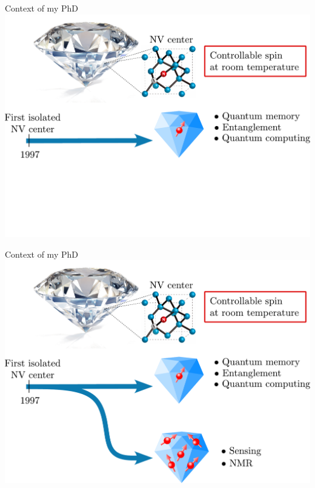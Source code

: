 \documentclass{beamer}
\begin{document}
\begin{frame}{Context of my PhD}
\centering
\includegraphics[width=\textwidth,height=0.85\textheight,keepaspectratio]{Slide_contexte_f-3}
\end{frame}

\begin{frame}{Context of my PhD}
\centering
\includegraphics[width=\textwidth,height=0.85\textheight,keepaspectratio]{Slide_contexte_f-2}
\end{frame}
\end{document}
